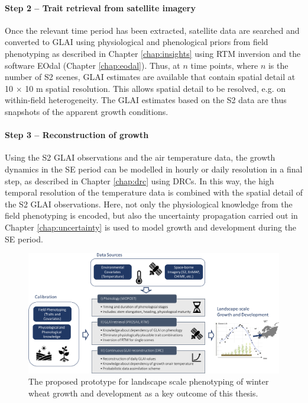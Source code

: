 \paragraph{Step 2 -- Trait retrieval from satellite imagery}
Once the relevant time period has been extracted, satellite data are searched and converted to \gls{GLAI} using physiological and phenological priors from field phenotyping as described in Chapter \ref{chap:insights} using RTM inversion and the software \gls{EOdal} (Chapter \ref{chap:eodal}). Thus, at $n$ time points, where $n$ is the number of \gls{S2} scenes, \gls{GLAI} estimates are available that contain spatial detail at 10 $\times$ 10 m spatial resolution. This allows spatial detail to be resolved, e.g. on within-field heterogeneity. The \gls{GLAI} estimates based on the \gls{S2} data are thus snapshots of the apparent growth conditions.

\paragraph{Step 3 -- Reconstruction of growth}
Using the \gls{S2} \gls{GLAI} observations and the air temperature data, the growth dynamics in the \gls{SE} period can be modelled in hourly or daily resolution in a final step, as described in Chapter \ref{chap:drc} using \gls{DRC}s. In this way, the high temporal resolution of the temperature data is combined with the spatial detail of the \gls{S2} \gls{GLAI} observations. Here, not only the physiological knowledge from the field phenotyping is encoded, but also the uncertainty propagation carried out in Chapter \ref{chap:uncertainty} is used to model growth and development during the \gls{SE} period.

\begin{figure}[H]
    \centering
    \includegraphics[width=\textwidth]{07-Discussion/img/prototype.jpg}
    \caption{The proposed prototype for landscape scale phenotyping of winter wheat growth and development as a key outcome of this thesis.}
    \label{fig:oa-disc-prototype}
\end{figure}

